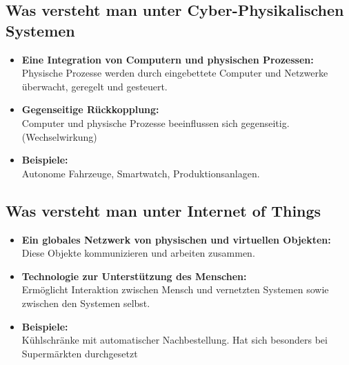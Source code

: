 \subsection{Was versteht man unter Cyber-Physikalischen Systemen}

\begin{itemize}
	\item \textbf{Eine Integration von Computern und physischen Prozessen:}
	\\Physische Prozesse werden durch eingebettete Computer und Netzwerke überwacht, geregelt und gesteuert.
	\item \textbf{Gegenseitige Rückkopplung:} 
	\\Computer und physische Prozesse beeinflussen sich gegenseitig. (Wechselwirkung)
	\item \textbf{Beispiele:} 
	\\Autonome Fahrzeuge, Smartwatch, Produktionsanlagen.
\end{itemize}

\subsection{Was versteht man unter Internet of Things}
\begin{itemize}
	\item \textbf{Ein globales Netzwerk von physischen und virtuellen Objekten:} 
	\\Diese Objekte kommunizieren und arbeiten zusammen.
	\item \textbf{Technologie zur Unterstützung des Menschen:}
	\\Ermöglicht Interaktion zwischen Mensch und vernetzten Systemen sowie zwischen den Systemen selbst.
	\item \textbf{Beispiele:} 
	\\Kühlschränke mit automatischer Nachbestellung. Hat sich besonders bei Supermärkten durchgesetzt
\end{itemize}


